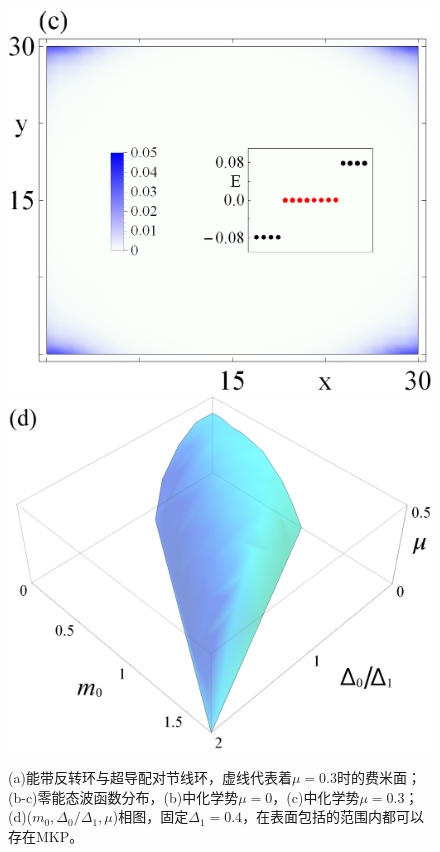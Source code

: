 \begin{figure}
\includegraphics[scale=0.45]{pic/fig12c}
\includegraphics[scale=0.09]{pic/fig12d}
\caption{(a)能带反转环与超导配对节线环，虚线代表着$\mu=0.3$时的费米面；(b-c)零能态波函数分布，(b)中化学势$\mu=0$，(c)中化学势$\mu=0.3$；(d)($m_0,\Delta_0/\Delta_1,\mu$)相图，固定$\Delta_1=0.4$，在表面包括的范围内都可以存在MKP。}\label{fig11}
\end{figure}


